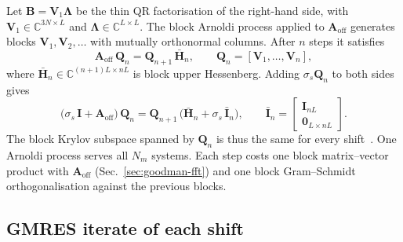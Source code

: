 \documentclass[11pt,a4paper]{article}
\begin{document}
Let $\mathbf{B} = \mathbf{V}_1 \boldsymbol{\Lambda}$ be the thin QR
factorisation of the right-hand side, with
$\mathbf{V}_1 \in \mathbb{C}^{3N \times L}$ and
$\boldsymbol{\Lambda} \in \mathbb{C}^{L \times L}$.
The block Arnoldi process applied to $\mathbf{A}_{\text{off}}$ generates
blocks $\mathbf{V}_1, \mathbf{V}_2, \ldots$ with mutually orthonormal
columns.
After $n$ steps it satisfies
\begin{equation}
  \mathbf{A}_{\text{off}}\,\mathbf{Q}_n
    = \mathbf{Q}_{n+1}\,\bar{\mathbf{H}}_n,
  \qquad
  \mathbf{Q}_n = [\mathbf{V}_1, \ldots, \mathbf{V}_n],
  \label{eq:block-arnoldi}
\end{equation}
where $\bar{\mathbf{H}}_n \in \mathbb{C}^{(n+1)L \times nL}$ is block
upper Hessenberg.
Adding $\sigma_s \mathbf{Q}_n$ to both sides gives
\begin{equation}
  \bigl(\sigma_s\,\mathbf{I} + \mathbf{A}_{\text{off}}\bigr)\,\mathbf{Q}_n
    = \mathbf{Q}_{n+1}\,
      \bigl(\bar{\mathbf{H}}_n + \sigma_s\,\bar{\mathbf{I}}_n\bigr),
  \qquad
  \bar{\mathbf{I}}_n =
  \begin{bmatrix} \mathbf{I}_{nL} \\ \mathbf{0}_{L \times nL} \end{bmatrix}.
  \label{eq:shifted-arnoldi}
\end{equation}
The block Krylov subspace spanned by $\mathbf{Q}_n$ is thus the same for
every shift~\cite{FrommerGlassner1998}.
One Arnoldi process serves all $N_m$ systems.
Each step costs one block matrix--vector product with
$\mathbf{A}_{\text{off}}$ (Sec.~\ref{sec:goodman-fft}) and one block
Gram--Schmidt orthogonalisation against the previous blocks.

\subsection{GMRES iterate of each shift}
\label{sec:shift-iterate}
\end{document}
